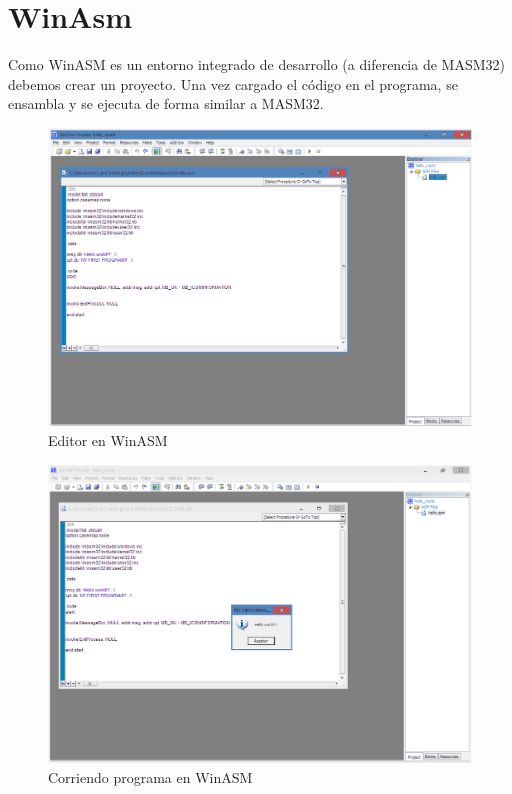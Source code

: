 \section{WinAsm}
Como WinASM es un entorno integrado de desarrollo (a diferencia de MASM32)
debemos crear un proyecto. Una vez cargado el código en el programa, se
ensambla y se ejecuta de forma similar a MASM32.

\begin{figure}[ht]
  \includegraphics[width=\linewidth]{figs/fig4.png}
  \caption{Editor en WinASM}
  \label{fig:4}
\end{figure}

\begin{figure}[ht]
  \includegraphics[width=\linewidth]{figs/fig5.png}
  \caption{Corriendo programa en WinASM}
  \label{fig:5}
\end{figure}